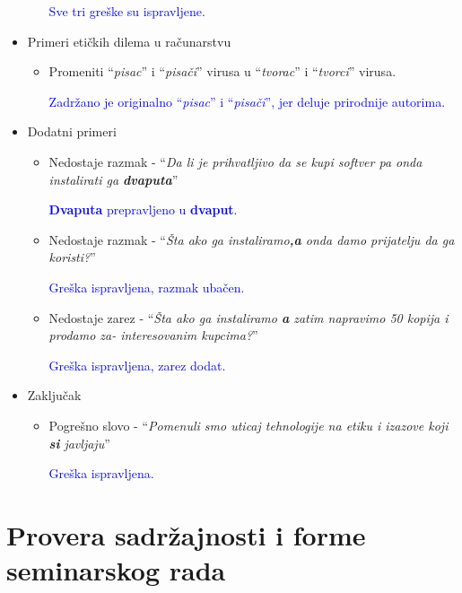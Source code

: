 \documentclass[a4paper]{report}
\newcommand{\odgovor}[1]{\textcolor{blue}{#1}}
\begin{document}
\begin{itemize}
\begin{itemize}
        \odgovor{Sve tri greške su ispravljene.}
        
    \end{itemize}
    \item Primeri etičkih dilema u računarstvu
    \begin{itemize}
        \item Promeniti ``\textit{pisac}'' i ``\textit{pisači}'' virusa u ``\textit{tvorac}'' i ``\textit{tvorci}'' virusa.
        
        \odgovor{Zadržano je originalno ``\textit{pisac}'' i ``\textit{pisači}'', jer deluje prirodnije autorima.}

    \end{itemize}
    \item Dodatni primeri
    \begin{itemize}
        \item Nedostaje razmak - ``\textit{Da li je prihvatljivo da se kupi softver pa onda instalirati ga \textbf{dvaputa}}''
        
        \odgovor{\textbf{Dvaputa} prepravljeno u \textbf{dvaput}.}

        \item Nedostaje razmak - ``\textit{Šta ako ga instaliramo\textbf{,a} onda damo prijatelju da ga koristi?}''
        
        \odgovor{Greška ispravljena, razmak ubačen.}

        \item Nedostaje zarez - ``\textit{Šta ako ga instaliramo\textbf{ a} zatim napravimo 50 kopija i prodamo za-
interesovanim kupcima?}''

		\odgovor{Greška ispravljena, zarez dodat.}

    \end{itemize}
    \item Zaključak
    \begin{itemize}
        \item Pogrešno slovo - ``\textit{Pomenuli smo uticaj tehnologije na etiku i izazove koji \textbf{si} javljaju}''

        \odgovor{Greška ispravljena.}

    \end{itemize}
\end{itemize}

\section{Provera sadržajnosti i forme seminarskog rada}
\end{document}
